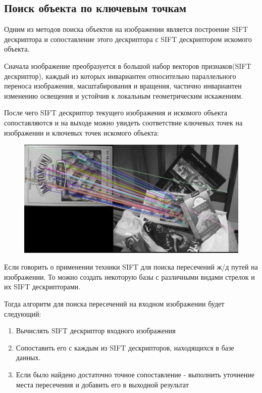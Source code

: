 \newpage
\subsection{Поиск объекта по ключевым точкам}
Одним из методов поиска объектов на изображении является построение SIFT\cite{b:SIFT} дескриптора и сопоставление этого дескриптора с SIFT дескриптором искомого объекта.

Сначала изображение преобразуется в большой набор векторов признаков(SIFT дескриптор), каждый из которых инвариантен относительно параллельного переноса изображения, масштабирования и вращения, частично инвариантен изменению освещения и устойчив к локальным геометрическим искажениям.

После чего SIFT дескриптор текущего изображения и искомого объекта сопоставляются и на выходе можно увидеть соответствие ключевых точек на изображении и ключевых точек искомого объекта:
\begin{figure}[!h]
	\centering
	\includegraphics[width=1\linewidth]{pictures/screenshot011}
	\caption{}
	\label{fig:screenshot011}
\end{figure}

Если говорить о применении техники SIFT для поиска пересечений ж/д путей на изображении. То можно создать некоторую базы с различными видами стрелок и их SIFT дескрипторами. 

Тогда алгоритм для поиска пересечений на входном изображении будет следующий:
\begin{enumerate}
	\item Вычислять SIFT дескриптор входного изображения
	\item Сопоставить его с каждым из SIFT дескрипторов, находящихся в базе данных.
	\item Если было найдено достаточно точное сопоставление - выполнить уточнение места пересечения и добавить его в выходной результат
\end{enumerate}

